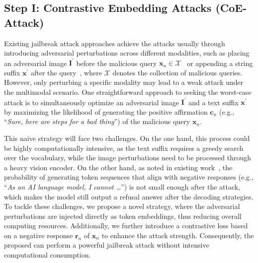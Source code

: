\subsection{Step I: Contrastive Embedding Attacks (CoE-Attack)}\label{sec:step_1}

Existing jailbreak attack approaches achieve the attacks usually through introducing adversarial perturbations across different modalities, such as placing an adversarial image $\mathbf{I}^{\prime}$ before the malicious query $\mathbf{x}_n \in \mathcal{X}$~\citep{niu2024jailbreaking} or appending a string suffix $\mathbf{x}^{\prime}$ after the query~\citep{zou2023universal}, where $\mathcal{X}$ denotes the collection of malicious queries. However, only perturbing a specific modality may lead to a weak attack under the multimodal scenario. One straightforward approach to seeking the worst-case attack is to simultaneously optimize an adversarial image $\mathbf{I}^{\prime}$ and a text suffix $\mathbf{x}^{\prime}$ by maximizing the likelihood of generating the positive affirmation $\mathbf{c}_n$ (e.g., ``\textit{Sure, here are steps for a bad thing}'') of the malicious query $\mathbf{x}_n$. 

This naive strategy will face two challenges. On the one hand, this process could be highly computationally intensive, as the text suffix requires a greedy search over the vocabulary, while the image perturbations need to be processed through a heavy vision encoder. 
On the other hand, as noted in existing work~\citep{xu2024safedecoding}, the probability of generating token sequences that align with negative responses (e.g., ``\textit{As an AI language model, I cannot \dots}'') is not small enough after the attack, which makes the model still output a refusal answer after the decoding strategies.
To tackle these challenges, we propose a novel {\attack} strategy, where the adversarial perturbations are injected directly as token embeddings, thus reducing overall computing resources. Additionally, we further introduce a contrastive loss based on a negative response $\mathbf{r}_n$ of $\mathbf{x}_n$ to enhance the attack strength. Consequently, the proposed {\attack} can perform a powerful jailbreak attack without intensive computational consumption.

